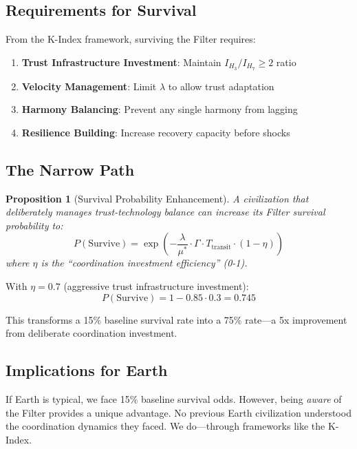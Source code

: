 \documentclass[11pt,a4paper]{article}
\newtheorem{proposition}{Proposition}
\begin{document}
\subsection{Requirements for Survival}

From the K-Index framework, surviving the Filter requires:

\begin{enumerate}
    \item \textbf{Trust Infrastructure Investment}: Maintain $I_{H_3}/I_{H_7} \geq 2$ ratio
    \item \textbf{Velocity Management}: Limit $\lambda$ to allow trust adaptation
    \item \textbf{Harmony Balancing}: Prevent any single harmony from lagging
    \item \textbf{Resilience Building}: Increase recovery capacity before shocks
\end{enumerate}

\subsection{The Narrow Path}

\begin{proposition}[Survival Probability Enhancement]
A civilization that deliberately manages trust-technology balance can increase its Filter survival probability to:
\begin{equation}
P(\text{Survive}) = \exp\left(-\frac{\lambda}{\mu^*} \cdot \Gamma \cdot T_{\text{transit}} \cdot (1 - \eta)\right)
\end{equation}
where $\eta$ is the ``coordination investment efficiency'' (0-1).
\end{proposition}

With $\eta = 0.7$ (aggressive trust infrastructure investment):
\begin{equation}
P(\text{Survive}) = 1 - 0.85 \cdot 0.3 = 0.745
\end{equation}

This transforms a 15\% baseline survival rate into a 75\% rate---a 5x improvement from deliberate coordination investment.

\subsection{Implications for Earth}

If Earth is typical, we face 15\% baseline survival odds. However, being \textit{aware} of the Filter provides a unique advantage. No previous Earth civilization understood the coordination dynamics they faced. We do---through frameworks like the K-Index.
\end{document}
